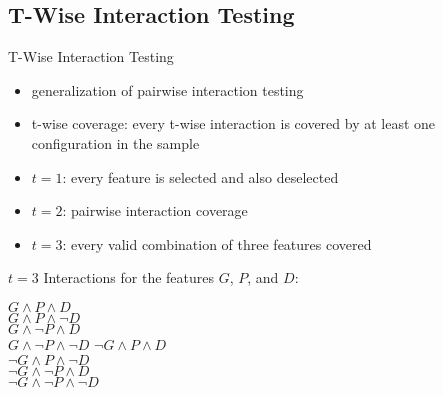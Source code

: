 \subsection{T-Wise Interaction Testing}
\begin{frame}{\myframetitle{}}
	\begin{mycolumns}[widths={60,38}]
		\begin{definition}{T-Wise Interaction Testing}
			\begin{itemize}
				\setlength\itemsep{.5em}
				\item generalization of pairwise interaction testing
				\item t-wise coverage: every t-wise interaction is covered by at least one configuration in the sample
				\item $t=1$: every feature is selected and also deselected
				\item $t=2$: pairwise interaction coverage
				\item $t=3$: every valid combination of three features covered
			\end{itemize}
		\end{definition}
	\mynextcolumn
		\begin{example}{{$t=3$ Interactions}}
			for the features $G$, $P$, and $D$:

			\begin{mycolumns}[animation=none]
				$G \wedge P \wedge D$\\
				$G \wedge P \wedge \neg D$\\
				$G \wedge \neg P \wedge D$\\
				$G \wedge \neg P \wedge \neg D$
			\mynextcolumn
				$\neg G \wedge P \wedge D$\\
				$\neg G \wedge P \wedge \neg D$\\
				$\neg G \wedge \neg P \wedge D$\\
				$\neg G \wedge \neg P \wedge \neg D$
			\end{mycolumns}
		\end{example}
	\end{mycolumns}
\end{frame}

